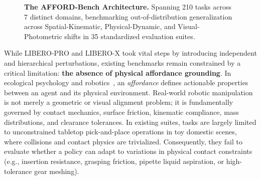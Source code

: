 \documentclass[conference]{IEEEtran}
\begin{document}
\begin{figure}[t]
\caption{\textbf{The AFFORD-Bench Architecture.} Spanning 210 tasks across 7 distinct domains, benchmarking out-of-distribution generalization across Spatial-Kinematic, Physical-Dynamic, and Visual-Photometric shifts in 35 standardized evaluation suites.}
\label{fig:teaser}
\end{figure}

While LIBERO-PRO and LIBERO-X took vital steps by introducing independent and hierarchical perturbations, existing benchmarks remain constrained by a critical limitation: \textbf{the absence of physical affordance grounding}. In ecological psychology and robotics~\cite{gibson1979ecological}, an \textit{affordance} defines actionable properties between an agent and its physical environment. Real-world robotic manipulation is not merely a geometric or visual alignment problem; it is fundamentally governed by contact mechanics, surface friction, kinematic compliance, mass distributions, and clearance tolerances. In existing suites, tasks are largely limited to unconstrained tabletop pick-and-place operations in toy domestic scenes, where collisions and contact physics are trivialized. Consequently, they fail to evaluate whether a policy can adapt to variations in physical contact constraints (e.g., insertion resistance, grasping friction, pipette liquid aspiration, or high-tolerance gear meshing).
\end{document}
